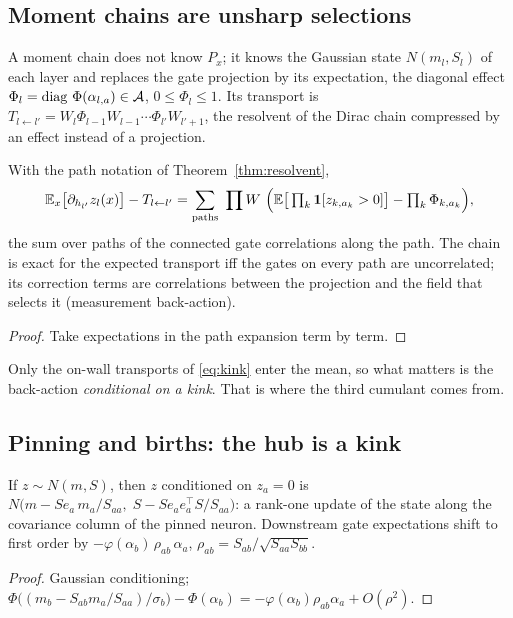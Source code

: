 \label{sec:memory}
\subsection{Moment chains are unsharp selections}
A moment chain does not know $P_x$; it knows the Gaussian state $N(m_l,S_l)$ of each layer and replaces the gate
projection by its expectation, the diagonal effect $\Phi_l=\operatorname{diag}\,\Phi(\alpha_{l,a})\in\mathcal A$, $0\le\Phi_l\le1$. Its
transport is $T_{l\leftarrow l'}=W_l\Phi_{l-1}W_{l-1}\cdots\Phi_{l'}W_{l'+1}$, the resolvent of the Dirac chain compressed by an
effect instead of a projection.

\begin{proposition}\label{prop:unsharp}
With the path notation of Theorem~\ref{thm:resolvent},
\[
\E_x\big[\partial_{h_{l'}}z_l(x)\big]-T_{l\leftarrow l'}=\sum_{\text{paths}}\ \prod W\ \Big(\E\big[\textstyle\prod_k\1[z_{k,a_k}>0]\big]-\prod_k\Phi_{k,a_k}\Big),
\]
the sum over paths of the connected gate correlations along the path. The chain is exact for the expected
transport iff the gates on every path are uncorrelated; its correction terms are correlations between the
projection and the field that selects it (measurement back-action).
\end{proposition}
\begin{proof}
Take expectations in the path expansion term by term.
\end{proof}

Only the on-wall transports of \eqref{eq:kink} enter the mean, so what matters is the back-action \emph{conditional on a
kink}. That is where the third cumulant comes from.

\subsection{Pinning and births: the hub is a kink}
\begin{lemma}[Pinning]\label{lem:pinning}
If $z\sim N(m,S)$, then $z$ conditioned on $z_a=0$ is $N\big(m-S e_a\,m_a/S_{aa},\;S-Se_ae_a^{\top}S/S_{aa}\big)$: a
rank-one update of the state along the covariance column of the pinned neuron. Downstream gate expectations shift
to first order by $-\varphi(\alpha_b)\,\rho_{ab}\,\alpha_a$, $\rho_{ab}=S_{ab}/\sqrt{S_{aa}S_{bb}}$.
\end{lemma}
\begin{proof}
Gaussian conditioning; $\Phi\big((m_b-S_{ab}m_a/S_{aa})/\sigma_b\big)-\Phi(\alpha_b)=-\varphi(\alpha_b)\rho_{ab}\alpha_a+O(\rho^2)$.
\end{proof}

